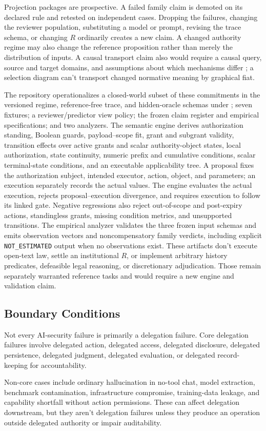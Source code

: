 Projection packages are prospective. A failed family claim is demoted on its declared rule and retested on independent cases. Dropping the failures, changing the reviewer population, substituting a model or prompt, revising the trace schema, or changing \(R\) ordinarily creates a new claim. A changed authority regime may also change the reference proposition rather than merely the distribution of inputs. A causal transport claim also would require a causal query, source and target domains, and assumptions about which mechanisms differ \citep{pearlBareinboim2014externalValidity}; a selection diagram can't transport changed normative meaning by graphical fiat.

The repository operationalizes a closed-world subset of these commitments in the versioned regime, reference-free trace, and hidden-oracle schemas under ; seven fixtures; a reviewer/predictor view policy; the frozen claim register and empirical specifications; and two analyzers. The semantic engine derives authorization standing, Boolean guards, payload--scope fit, grant and subgrant validity, transition effects over active grants and scalar authority-object states, local authorization, state continuity, numeric prefix and cumulative conditions, scalar terminal-state conditions, and an executable applicability tree. A proposal fixes the authorization subject, intended executor, action, object, and parameters; an execution separately records the actual values. The engine evaluates the actual execution, rejects proposal--execution divergence, and requires execution to follow its linked gate. Negative regressions also reject out-of-scope and post-expiry actions, standingless grants, missing condition metrics, and unsupported transitions. The empirical analyzer validates the three frozen input schemas and emits observation vectors and noncompensatory family verdicts, including explicit \texttt{NOT\_ESTIMATED} output when no observations exist. These artifacts don't execute open-text law, settle an institutional \(R\), or implement arbitrary history predicates, defeasible legal reasoning, or discretionary adjudication. Those remain separately warranted reference tasks and would require a new engine and validation claim.

\subsection{Boundary Conditions}

Not every AI-security failure is primarily a delegation failure. Core delegation failures involve delegated action, delegated access, delegated disclosure, delegated persistence, delegated judgment, delegated evaluation, or delegated record-keeping for accountability.

Non-core cases include ordinary hallucination in no-tool chat, model extraction, benchmark contamination, infrastructure compromise, training-data leakage, and capability shortfall without action permissions. These can affect delegation downstream, but they aren't delegation failures unless they produce an operation outside delegated authority or impair auditability.
